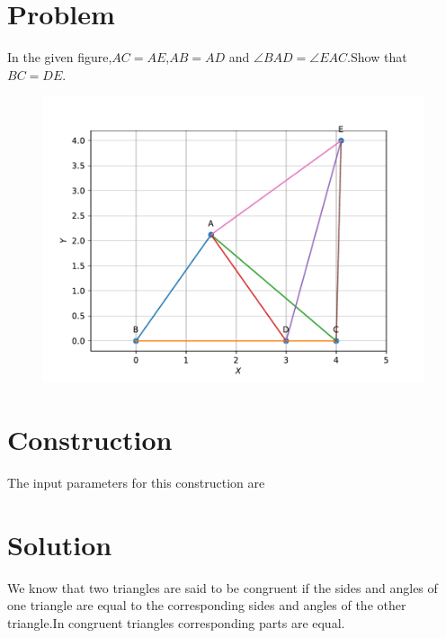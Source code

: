 \documentclass[10pt,a4paper]{article}
\title{\mytitle}
\begin{document}
	\maketitle
	\tableofcontents
	
\section{Problem}	
In the given figure,$AC =AE$,$AB=AD$ and $\angle BAD=\angle EAC$.Show that $BC=DE$.

\begin{figure}[!h]
	\begin{center}
		\includegraphics[width=5in]{./fig/line.pdf}
	\end{center}
\caption{}
\label{figure}
\end{figure}


\section{Construction}


The input parameters for this construction are

\begin{table}[!h]
\centering

\caption{}
\label{Inputs}
\end{table}

\section{Solution}
 We know that two triangles are  said to be congruent if the sides and angles of one
triangle are equal to the corresponding sides and angles of the other triangle.In congruent triangles corresponding parts are equal.
\end{document}
